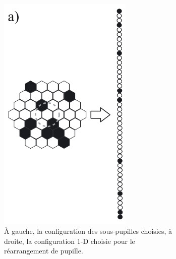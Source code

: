 \begin{figure}[ht!]
    \centering
    \begin{subfigure}[t]{0.45\textwidth}
        \centering
        \includegraphics[width=0.7\textwidth]{Figure_Chap1/Huby2012_Figure2a.png}
        \caption{À gauche, la configuration des sous-pupilles choisies, à droite, la configuration 1-D choisie pour le réarrangement de pupille.}
        \label{fig:FIRSTv1PupilMaskingA}
    \end{subfigure}\hspace{0.01\textwidth}
    \begin{subfigure}[t]{0.45\textwidth}
        \centering

\end{subfigure}
\end{figure}

